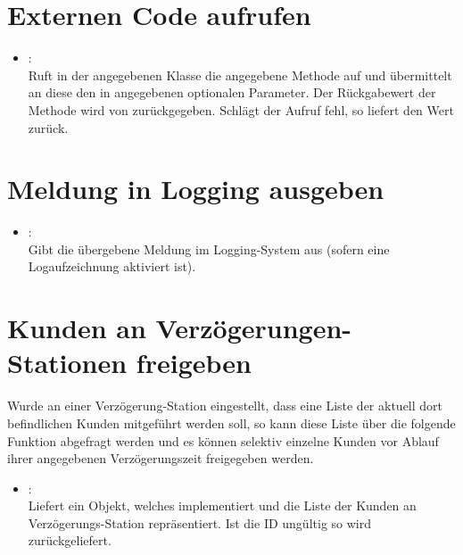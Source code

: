 \section{Externen Code aufrufen}

\begin{itemize}

\item
{}:\\
Ruft in der angegebenen Klasse die angegebene Methode auf und übermittelt an diese den in
 angegebenen optionalen Parameter. Der Rückgabewert der Methode wird von 
zurückgegeben. Schlägt der Aufruf fehl, so liefert  den Wert  zurück.
\end{itemize}

\section{Meldung in Logging ausgeben}

\begin{itemize}

\item
{}:\\
Gibt die übergebene Meldung im Logging-System aus (sofern eine Logaufzeichnung aktiviert ist).

\end{itemize}

\section{Kunden an Verzögerungen-Stationen freigeben}

Wurde an einer Verzögerung-Station eingestellt, dass eine Liste der aktuell dort befindlichen Kunden
mitgeführt werden soll, so kann diese Liste über die folgende Funktion abgefragt werden und es können
selektiv einzelne Kunden vor Ablauf ihrer angegebenen Verzögerungszeit freigegeben werden.

\begin{itemize}

\item
{}:\\
Liefert ein Objekt, welches  implementiert und die Liste
der Kunden an Verzögerungs-Station  repräsentiert. Ist die ID ungültig
so wird  zurückgeliefert. 
\end{itemize}



